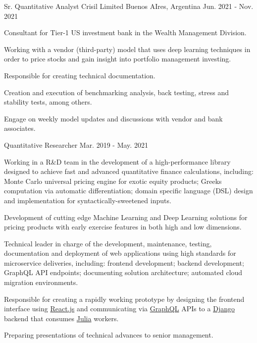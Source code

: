 \begin{cventries}
  \cventry
    {Sr. Quantitative Analyst} %
    {Crisil Limited} %
    {Buenos AIres, Argentina}  %
    {Jun. 2021 - Nov. 2021} %
    {
      \begin{cvitems} %
        \item {Consultant for Tier-1 US investment bank in the Wealth Management Division.}
        \item {Working with a vendor (third-party) model that uses deep learning techniques in order to price stocks and gain insight into portfolio management investing.}
        \item {Responsible for creating technical documentation.}
        \item {Creation and execution of benchmarking analysis, back testing, stress and stability tests, among others.}
        \item {Engage on weekly model updates and discussions with vendor and bank associates.}
      \end{cvitems}
    }

  \cventry
    {Quantitative Researcher} %
    {} %
    {} %
    {Mar. 2019 - May. 2021} %
    {
      \begin{cvitems} %
          \item{Working in a R\&D team in the development of a high-performance library designed to achieve fast and advanced quantitative finance calculations, including: Monte Carlo universal pricing engine for exotic equity products; Greeks computation via automatic differentiation; domain specific language (DSL) design and implementation for syntactically-sweetened inputs.}
          \item{Development of cutting edge Machine Learning and Deep Learning solutions for pricing products with early exercise features in both high and low dimensions.}
          \item {Technical leader in charge of the development, maintenance, testing, documentation and deployment of web applications using high standards for microservice deliveries, including: frontend development; backend development; GraphQL API endpoints; documenting solution architecture; automated cloud migration environments.}
          \item{Responsible for creating a rapidly working prototype by designing the frontend interface using \href{https://reactjs.org/}{React.js} and communicating via \href{https://graphql.org/}{GraphQL} APIs to a \href{https://www.djangoproject.com/}{Django} backend that consumes \href{https://julialang.org/}{Julia} workers.}
          \item{Preparing presentations of technical advances to senior management.}
      \end{cvitems}
    }


\end{cventries}
